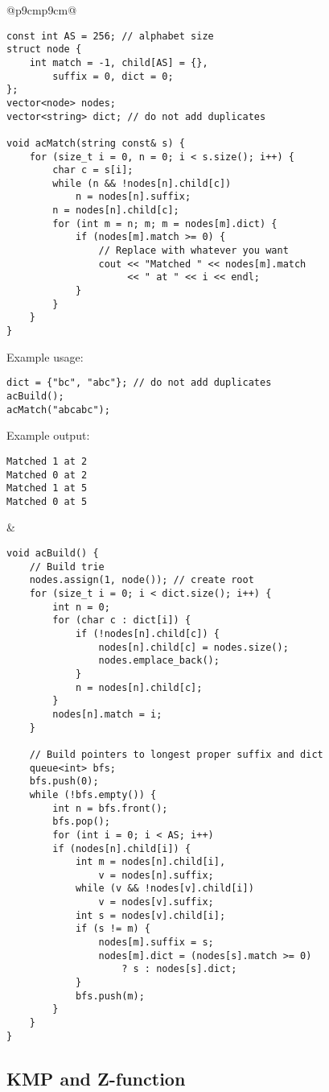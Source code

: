\documentclass[letterpaper]{article}
\begin{document}
\begin{tabular}{@{}p{9cm}p{9cm}@{}}
    \begin{lstlisting}
const int AS = 256; // alphabet size
struct node {
	int match = -1, child[AS] = {},
	    suffix = 0, dict = 0;
};
vector<node> nodes;
vector<string> dict; // do not add duplicates

void acMatch(string const& s) {
	for (size_t i = 0, n = 0; i < s.size(); i++) {
		char c = s[i];
		while (n && !nodes[n].child[c])
			n = nodes[n].suffix;
		n = nodes[n].child[c];
		for (int m = n; m; m = nodes[m].dict) {
			if (nodes[m].match >= 0) {
				// Replace with whatever you want
				cout << "Matched " << nodes[m].match
				     << " at " << i << endl;
			}
		}
	}
}
\end{lstlisting}

    Example usage:

    \begin{lstlisting}
dict = {"bc", "abc"}; // do not add duplicates
acBuild();
acMatch("abcabc");
\end{lstlisting}

    Example output:

    \begin{lstlisting}
Matched 1 at 2
Matched 0 at 2
Matched 1 at 5
Matched 0 at 5
\end{lstlisting}
     &
    \begin{lstlisting}
void acBuild() {
	// Build trie
	nodes.assign(1, node()); // create root
	for (size_t i = 0; i < dict.size(); i++) {
		int n = 0;
		for (char c : dict[i]) {
			if (!nodes[n].child[c]) {
				nodes[n].child[c] = nodes.size();
				nodes.emplace_back();
			}
			n = nodes[n].child[c];
		}
		nodes[n].match = i;
	}

	// Build pointers to longest proper suffix and dict
	queue<int> bfs;
	bfs.push(0);
	while (!bfs.empty()) {
		int n = bfs.front();
		bfs.pop();
		for (int i = 0; i < AS; i++)
		if (nodes[n].child[i]) {
			int m = nodes[n].child[i],
			    v = nodes[n].suffix;
			while (v && !nodes[v].child[i])
				v = nodes[v].suffix;
			int s = nodes[v].child[i];
			if (s != m) {
				nodes[m].suffix = s;
				nodes[m].dict = (nodes[s].match >= 0)
					? s : nodes[s].dict;
			}
			bfs.push(m);
		}
	}
}
\end{lstlisting}
\end{tabular}

\clearpage

\subsection{KMP and Z-function}
\end{document}
